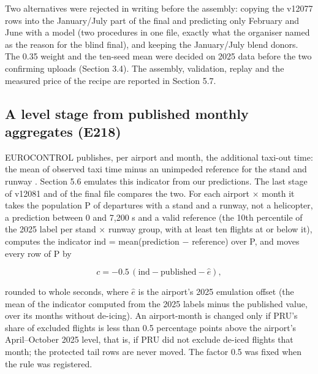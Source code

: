 \documentclass[
  manuscript=article,  %
  layout=preprint,     %
  year=2026,
  volume=4,
]{extra/joas}
\begin{document}
Two alternatives were rejected in writing before the assembly: copying the v12077 rows into the January/July part of the final and predicting only February and June with a model (two procedures in one file, exactly what the organiser named as the reason for the blind final), and keeping the January/July blend donors. The 0.35 weight and the ten-seed mean were decided on 2025 data before the two confirming uploads (Section 3.4). The assembly, validation, replay and the measured price of the recipe are reported in Section 5.7.

\subsection{A level stage from published monthly aggregates (E218)}\label{a-level-stage-from-published-monthly-aggregates-e218}

EUROCONTROL publishes, per airport and month, the additional taxi-out time: the mean of observed taxi time minus an unimpeded reference for the stand and runway \autocite{eurocontrol2023atxot,eurocontrol2026atxotdata}. Section 5.6 emulates this indicator from our predictions. The last stage of v12081 and of the final file compares the two. For each airport $\times$ month it takes the population P of departures with a stand and a runway, not a helicopter, a prediction between 0 and 7,200 s and a valid reference (the 10th percentile of the 2025 label per stand $\times$ runway group, with at least ten flights at or below it), computes the indicator \(\mathrm{ind}\) = mean(prediction $-$ reference) over P, and moves every row of P by

\begin{equation}c = -0.5\,(\mathrm{ind} - \mathrm{published} - \hat e),\end{equation}

rounded to whole seconds, where \(\hat e\) is the airport's 2025 emulation offset (the mean of the indicator computed from the 2025 labels minus the published value, over its months without de-icing). An airport-month is changed only if PRU's share of excluded flights is less than 0.5 percentage points above the airport's April--October 2025 level, that is, if PRU did not exclude de-iced flights that month; the protected tail rows are never moved. The factor 0.5 was fixed when the rule was registered.
\end{document}
